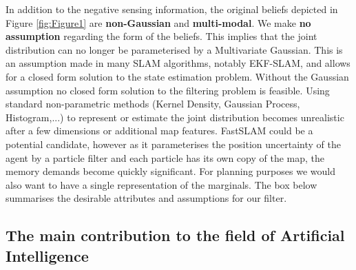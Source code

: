 \documentclass{frontiersSCNS} %
\begin{document}
In addition to the negative sensing information, the original beliefs depicted in Figure \ref{fig:Figure1} are \textbf{non-Gaussian}
and \textbf{multi-modal}. We make \textbf{no assumption} regarding the form of the beliefs. This implies that the joint distribution 
can no longer be parameterised by a Multivariate Gaussian. 
This is an assumption made in many SLAM algorithms, notably EKF-SLAM, and allows for a closed form solution to the state estimation problem. Without the Gaussian assumption 
no closed form solution to the filtering problem is feasible. 
Using standard non-parametric methods (Kernel Density, Gaussian Process, Histogram,...) to represent or estimate the joint distribution becomes
unrealistic after a few dimensions or additional map features. 
FastSLAM could be a potential candidate, however as it parameterises the position uncertainty of the agent by a particle filter and each
particle has its own copy of the map, the memory demands become quickly significant.  For planning purposes we would also want to have a 
single representation of the marginals. The box below summarises the desirable attributes and assumptions for our filter.

\begin{center}
%
\end{center}

\subsection{The main contribution to the field of Artificial Intelligence} 
\end{document}
